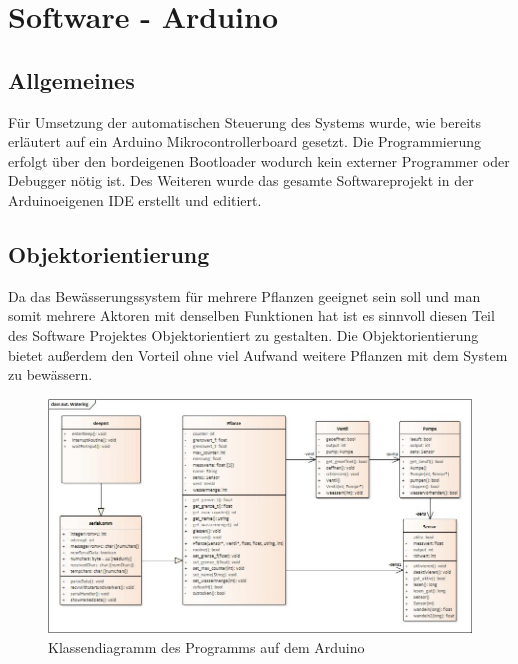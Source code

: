 \newpage
\fancyhf{}
\section{Software - Arduino}
\subsection{Allgemeines}
Für Umsetzung der automatischen Steuerung des Systems wurde, wie bereits erläutert
auf ein Arduino Mikrocontrollerboard gesetzt. Die Programmierung erfolgt über den
bordeigenen Bootloader wodurch kein externer Programmer oder Debugger nötig ist. Des
Weiteren wurde das gesamte Softwareprojekt in der Arduinoeigenen IDE erstellt und editiert.
\subsection{Objektorientierung}
Da das Bewässerungssystem für mehrere Pflanzen geeignet sein soll und man somit
mehrere Aktoren mit denselben Funktionen hat ist es sinnvoll diesen Teil des Software
Projektes Objektorientiert zu gestalten. Die Objektorientierung bietet außerdem den
Vorteil ohne viel Aufwand weitere Pflanzen mit dem System zu bewässern.
\begin{figure}[ht]
    \centering
    \includegraphics[width=\textwidth]{marcel/AutWatering}
    \caption{Klassendiagramm des Programms auf dem Arduino}
    \label{arduinoklassen}
\end{figure}

